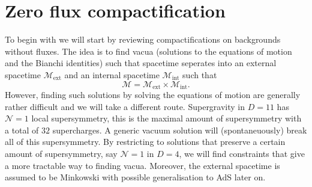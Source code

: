 

\section{Zero flux compactification\label{sec:VanishingFluxCompactification}}
To begin with we will start by reviewing compactifications on backgrounds without fluxes. The idea is to find vacua (solutions to the equations of motion and the Bianchi identities) such that spacetime seperates into an external spacetime $\mathcal{M}_{\text{ext}}$ and an internal spacetime $\mathcal{M}_{\text{int}}$ such that 
\begin{equation}
    \mathcal{M} = \mathcal{M}_{\text{ext}}\times \mathcal{M}_{\text{int}}.
\end{equation}
However, finding such solutions by solving the equations of motion are generally rather difficult and we will take a different route. Supergravity in $D=11$ has $\mathcal{N}=1$ local supersymmetry, this is the maximal amount of supersymmetry with a total of $32$ supercharges. A generic vacuum solution will (spontaneuously) break all of this supersymmetry. By restricting to solutions that preserve a certain amount of supersymmetry, say $\mathcal{N}=1$ in $D=4$, we will find constraints that give a more tractable way to finding vacua. Moreover, the external spacetime is assumed to be Minkowski with possible generalisation to AdS later on. 

